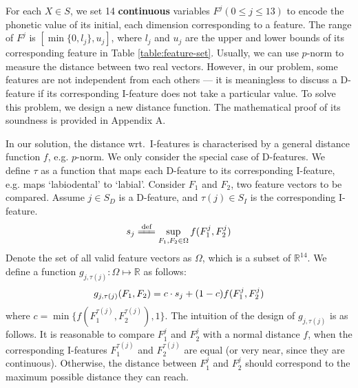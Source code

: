 For each $X \in S$, we set 14 \textbf{continuous} variables $F^j (0\leqslant j\leqslant 13)$ to encode the phonetic value of its initial, 
each dimension corresponding to a feature. 
The range of $F^j$ is $[\min\{0,l_j\}, u_j]$, where $l_j$ and $u_j$ are the upper and lower bounds of its corresponding feature in Table \ref{table:feature-set}.
Usually, we can use $p$-norm to measure the distance between two real vectors.
However, in our problem, some features are not independent from each others --- it is meaningless to discuss a D-feature if its corresponding 
I-feature does not take a particular value.
To solve this problem, we design a new distance function. 
The mathematical proof of its soundness is provided in Appendix A.

In our solution, the distance wrt.\ I-features is characterised by a general distance function $f$, e.g. $p$-norm.
We only consider the special case of D-features. 
We define $\tau$ as a function that maps each D-feature to its corresponding I-feature, e.g. maps `labiodental' to `labial'. Consider $F_1$ and $F_2$, two feature vectors to be compared. 
Assume $j \in S_D$ is a D-feature, and $\tau(j) \in S_I$ is the corresponding I-feature.
\begin{equation}
    \setlen s_j\xlongequal{\text{def}}\sup\limits_{F_1,F_2\in\Omega}f(F_1^{j},F_2^{j})
\end{equation}
Denote the set of all valid feature vectors as $\Omega$, which is a subset of $\mathbb{R}^{14}$. We define a function $g_{j,\tau(j)}:\Omega \mapsto\mathbb{R}$ as follows:
\begin{equation}
\label{distance-func}
    \setlen
  g_{j,\tau(j)}(F_1, F_2)=c\cdot s_j+(1-c)f(F_1^{j},F_2^{j})
\end{equation}
where $c=\min\{f(F_1^{\tau(j)},F_2^{\tau(j)}),1\}$.
The intuition of the design of $g_{j,\tau(j)}$ is as follows. 
It is reasonable to compare $F_1^j$ and $F_2^j$ with a normal distance $f$, when the corresponding I-features $F_1^{\tau(j)}$ and $F_2^{\tau(j)}$ are equal (or very near, since they are continuous).
Otherwise, the distance between $F_1^j$ and $F_2^j$ should correspond to the maximum possible distance they can reach.

